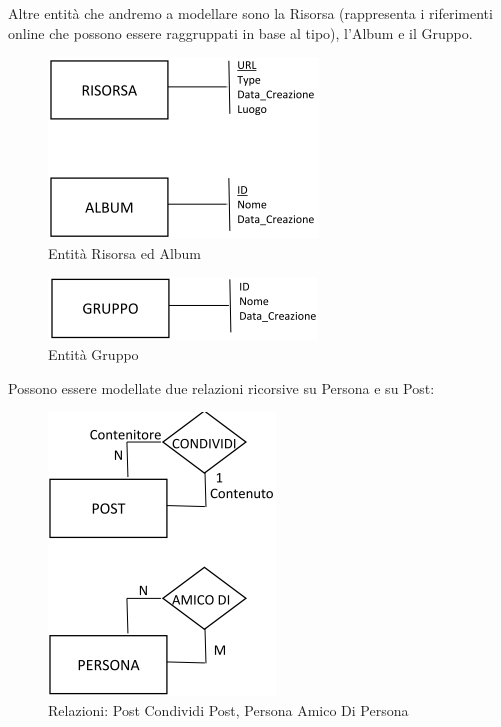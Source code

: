 Altre entità che andremo a modellare sono la Risorsa (rappresenta i riferimenti online che possono essere raggruppati in base al tipo), l’Album e il Gruppo.   

\begin{center}
\begin{figure}[H]
\centering
\includegraphics[scale=1]{figures/risorsa_album.png}
\caption{Entità Risorsa ed Album}
\end{figure}
\end{center}

\begin{center}
\begin{figure}[H]
\centering
\includegraphics[scale=1]{figures/gruppo.png}
\caption{Entità Gruppo}
\end{figure}
\end{center}

Possono essere modellate due relazioni ricorsive su Persona e su Post:

\begin{center}
\begin{figure}[H]
\centering
\includegraphics[scale=1]{figures/pap_pcp.png}
\caption{Relazioni: Post Condividi Post, Persona Amico Di Persona}
\end{figure}
\end{center}

